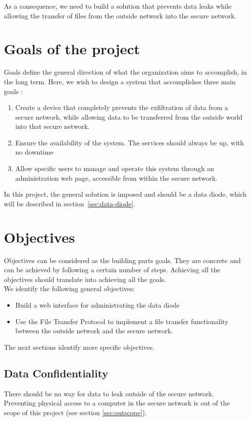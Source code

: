 \documentclass[a4paper,11pt]{article}
\begin{document}
As a consequence, we need to build a solution that prevents data leaks while allowing the transfer of files from the outside network into the secure network.

\section{Goals of the project}
\label{sec:goals}
Goals define the general direction of what the organization aims to accomplish, in the long term. Here, we wish to design a system that accomplishes three main goals :

\begin{enumerate}
\item{Create a device that completely prevents the exfiltration of data from a secure network, while allowing data to be transferred from the outside world into that secure network.}
\item{Ensure the availability of the system. The services should always be up, with no downtime}
\item{Allow specific users to manage and operate this system through an administration web page, accessible from within the secure network.}
\end{enumerate}

In this project, the general solution is imposed and should be a data diode, which will be described in section~\ref{sec:data-diode}.


\section{Objectives}
\label{sec:objectives}
Objectives can be considered as the building parts goals. They are concrete and can be achieved by following a certain number of steps. Achieving all the objectives should translate into achieving all the goals.\\


We identify the following general objectives:
\begin{itemize}
\item{Build a web interface for administrating the data diode}
\item{Use the File Transfer Protocol to implement a file transfer functionality between the outside network and the secure network.}
\end{itemize}

The next sections identify more specific objectives.

\subsection{Data Confidentiality}
There should be no way for data to leak outside of the secure network. Preventing physical access to a computer in the secure network is out of the scope of this project (see section \ref{sec:outscope}).\\
\end{document}
